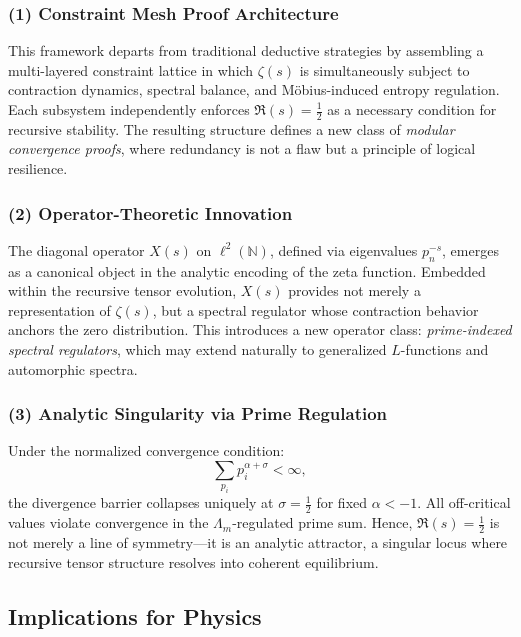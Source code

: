 \documentclass[12pt]{article}
\begin{document}
\subsubsection*{(1) Constraint Mesh Proof Architecture}

This framework departs from traditional deductive strategies by assembling a multi-layered constraint lattice in which $\zeta(s)$ is simultaneously subject to contraction dynamics, spectral balance, and Möbius-induced entropy regulation. Each subsystem independently enforces $\Re(s) = \tfrac{1}{2}$ as a necessary condition for recursive stability. The resulting structure defines a new class of \emph{modular convergence proofs}, where redundancy is not a flaw but a principle of logical resilience.

\subsubsection*{(2) Operator-Theoretic Innovation}

The diagonal operator $X(s)$ on $\ell^2(\mathbb{N})$, defined via eigenvalues $p_n^{-s}$, emerges as a canonical object in the analytic encoding of the zeta function. Embedded within the recursive tensor evolution, $X(s)$ provides not merely a representation of $\zeta(s)$, but a spectral regulator whose contraction behavior anchors the zero distribution. This introduces a new operator class: \emph{prime-indexed spectral regulators}, which may extend naturally to generalized $L$-functions and automorphic spectra.

\subsubsection*{(3) Analytic Singularity via Prime Regulation}

Under the normalized convergence condition:
\[
\sum_{p_i} p_i^{\alpha + \sigma} < \infty,
\]
the divergence barrier collapses uniquely at $\sigma = \tfrac{1}{2}$ for fixed $\alpha < -1$. All off-critical values violate convergence in the $\Lambda_m$-regulated prime sum. Hence, $\Re(s) = \tfrac{1}{2}$ is not merely a line of symmetry—it is an analytic attractor, a singular locus where recursive tensor structure resolves into coherent equilibrium.

\subsection{Implications for Physics}
\end{document}
